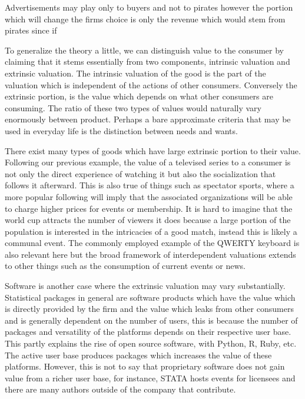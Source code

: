 \documentclass{article}
\begin{document}
Advertisements may play only to buyers and not to pirates however the portion which will change the firms choice is only the revenue which would stem from pirates since if 

To generalize the theory a little, we can distinguish value to the consumer by claiming that it stems essentially from two components, intrinsic valuation and extrinsic valuation. The intrinsic valuation of the good is the part of the valuation which is independent of the actions of other consumers. Conversely the extrinsic portion, is the value which depends on what other consumers are consuming. The ratio of these two types of values would naturally vary enormously between product. Perhaps a bare approximate criteria that may be used in everyday life is the distinction between needs and wants. 

There exist many types of goods which have large extrinsic portion to their value. Following our previous example, the value of a televised series to a consumer is not only the direct experience of watching it but also the socialization that follows it afterward. This is also true of things such as spectator sports, where a more popular following will imply that the associated organizations will be able to charge higher prices for events or membership. It is hard to imagine that the world cup attracts the number of viewers it does because a large portion of the population is interested in the intricacies of a good match, instead this is likely a communal event. The commonly employed example of the QWERTY keyboard is also relevant here but the broad framework of interdependent valuations extends to other things such as the consumption of current events or news. 

Software is another case where the extrinsic valuation may vary substantially. Statistical packages in general are software products which have the value which is directly provided by the firm and the value which leaks from other consumers and is generally dependent on the number of users, this is because the number of packages and versatility of the platforms depends on their respective user base. This partly explains the rise of open source software, with Python, R, Ruby, etc.  The active user base produces packages which increases the value of these platforms. However, this is not to say that proprietary software does not gain value from a richer user base, for instance, STATA hosts events for licensees and there are many authors outside of the company that contribute.  
\end{document}
